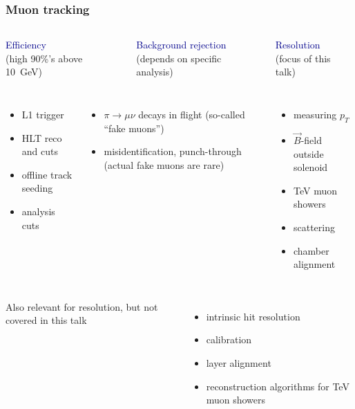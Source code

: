 \documentclass[compress]{beamer}
\begin{document}
\begin{frame}
\frametitle{Muon tracking}

\vfill
\begin{columns}
\textcolor{darkblue}{Efficiency} \\ {\scriptsize (high 90\%'s above 10~GeV)}

\textcolor{darkblue}{Background rejection} \\ {\scriptsize (depends on specific analysis)}

\textcolor{darkblue}{Resolution} \\ {\scriptsize (focus of this talk)}

\end{columns}

\begin{columns}
\begin{itemize}
\item L1 trigger
\item HLT reco and cuts
\item offline track seeding
\item analysis cuts
\end{itemize}

\begin{itemize}
\item $\pi \to \mu \nu$ decays in flight (so-called ``fake muons'')
\item misidentification, punch-through (actual fake muons are rare)
\end{itemize}

\begin{itemize}
\item measuring $p_T$
\item $\vec{B}$-field outside solenoid
\item TeV muon showers
\item scattering
\item chamber alignment
\end{itemize}
\end{columns}

\vfill
\scriptsize
\begin{columns}
Also relevant for resolution, but not covered in this talk
\begin{itemize}\setlength{\itemsep}{-0.1 cm}
\item intrinsic hit resolution
\item calibration
\item layer alignment
\item reconstruction algorithms for TeV muon showers
\end{itemize}
\end{columns}
\end{frame}
\end{document}
